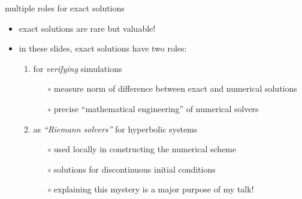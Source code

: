 \documentclass[10pt,dvipsnames,usepdftitle=false,
hyperref={pdftitle = {Finite volume methods},
    pdfauthor = {Ed Bueler}}]{beamer}
\begin{document}
\begin{frame}{multiple roles for exact solutions}

\begin{itemize}
\item exact solutions are rare but valuable!
\item in these slides, exact solutions have two roles:
  \begin{enumerate}
  \item for \emph{verifying} simulations
      \begin{itemize}
      \item[$\circ$] measure norm of difference between exact and numerical solutions
      \item[$\circ$] precise ``mathematical engineering'' of numerical solvers
      \end{itemize}
  \item as \emph{``Riemann solvers''} for hyperbolic systems
      \begin{itemize}
      \item[$\circ$] used locally in constructing the numerical scheme
      \item[$\circ$] solutions for discontinuous initial conditions
      \item[$\circ$] explaining this mystery is a major purpose of my talk!
      \end{itemize}
  \end{enumerate}
\end{itemize}
\end{frame}
\end{document}
